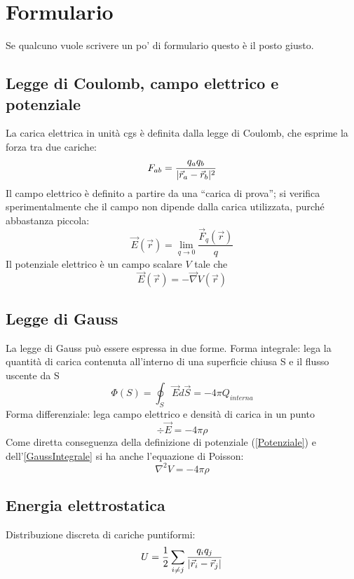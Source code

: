 \documentclass[../main.tex]{subfiles}
\begin{document}
\section{Formulario}
\setcounter{equation}{0}
\renewcommand{\theequation}{F.\arabic{equation}}

Se qualcuno vuole scrivere un po' di formulario questo è il posto giusto.

\subsection{Legge di Coulomb, campo elettrico e potenziale}\label{Preliminari}
La carica elettrica in unit\`a cgs \`e definita dalla legge di Coulomb, che esprime la forza tra due cariche:
\begin{equation}
	\label{Coulomb}
	F_{ab}=\frac{q_aq_b}{\lvert\vec r_a -\vec r_b\rvert^2}
\end{equation}
Il campo elettrico \`e definito a partire da una ``carica di prova''; si verifica sperimentalmente che il campo non dipende dalla carica utilizzata, purch\'e abbastanza piccola:
\begin{equation}
	\label{CampoElettrico}
	\vec E(\vec r)=\lim_{q \to 0} \frac{\vec F_q(\vec r)}{q}
\end{equation}
Il potenziale elettrico \`e un campo scalare $V$ tale che
\begin{equation}
	\label{Potenziale}
	\vec E(\vec r) = - \vec \nabla V(\vec r)
\end{equation}

\subsection{Legge di Gauss}\label{Gauss}
La legge di Gauss pu\`o essere espressa in due forme.\newline
Forma integrale: lega la quantit\`a di carica contenuta all'interno di una superficie chiusa S e il flusso uscente da S
\begin{equation}
	\label{GaussIntegrale}
	\Phi(S)= \oint_S \vec E d\vec S=-4\pi Q_{interna}
\end{equation}
Forma differenziale: lega campo elettrico e densit\`a di carica in un punto 
\begin{equation}
	\label{GaussDifferenziale}
	\div \vec E=-4\pi\rho
\end{equation}
Come diretta conseguenza della definizione di potenziale (\cref{Potenziale}) e dell'\cref{GaussIntegrale} si ha anche l'equazione di Poisson:
\begin{equation}
	\label{Poisson}
	\nabla^2V= -4\pi \rho
\end{equation}

\subsection{Energia elettrostatica}\label{EnergiaElettrostatica}
Distribuzione discreta di cariche puntiformi:
\begin{equation}
	\label{EEDiscreta}
	U= \frac{1}{2} \sum_{i\neq j} \frac{q_iq_j}{\lvert\vec r_i -\vec r_j\rvert}
\end{equation}
\end{document}
